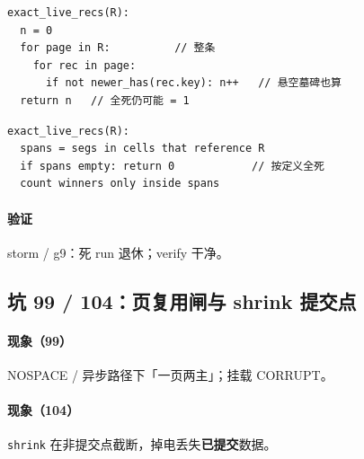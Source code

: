 \begin{figure}[H]
\centering
{}
\end{figure}

\begin{fixold}
\begin{lstlisting}[language=pseudo]
exact_live_recs(R):
  n = 0
  for page in R:          // 整条
    for rec in page:
      if not newer_has(rec.key): n++   // 悬空墓碑也算
  return n   // 全死仍可能 = 1
\end{lstlisting}
\end{fixold}

\begin{fixnew}
\begin{lstlisting}[language=pseudo]
exact_live_recs(R):
  spans = segs in cells that reference R
  if spans empty: return 0            // 按定义全死
  count winners only inside spans
\end{lstlisting}
\end{fixnew}

\paragraph{验证}
storm / g9：死 run 退休；verify 干净。

\subsection{坑 99 / 104：页复用闸与 shrink 提交点}
\paragraph{现象（99）}
NOSPACE / 异步路径下「一页两主」；挂载 CORRUPT。

\paragraph{现象（104）}
\texttt{shrink} 在非提交点截断，掉电丢失\textbf{已提交}数据。

